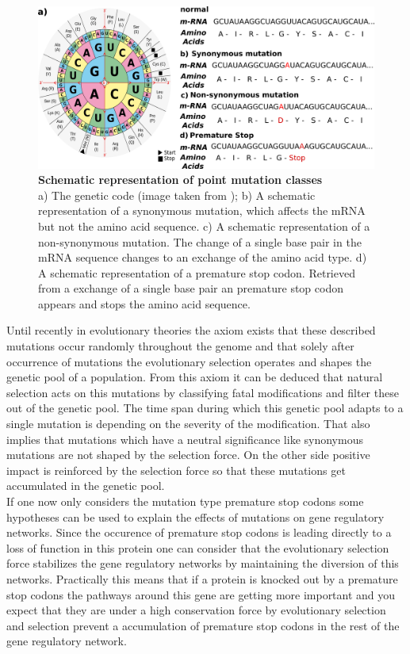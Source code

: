 \begin{figure}[tb]
    \centering
    \begin{minipage}[h]{0.9\textwidth}
      \centering
      \includegraphics[width=1\textwidth]{images/Mutations.png}
      \caption{\textbf{Schematic representation of point mutation classes}\\
      a) The genetic code (image taken from \textcite{bresch2013}); b) A schematic representation of a synonymous mutation, which affects the mRNA but not the amino acid sequence. c) A schematic representation of a non-synonymous mutation. The change of a single base pair in the mRNA sequence changes to an exchange of the amino acid type. d) A schematic representation of a premature stop codon. Retrieved from a exchange of a single base pair an premature stop codon appears and stops the amino acid sequence.}
     \label{fig:Codons}
    \end{minipage}
  \end{figure}
Until recently in evolutionary theories the axiom exists that these described mutations occur randomly throughout the genome and that solely after occurrence of mutations the evolutionary selection operates and shapes the genetic pool of a population\cite{futuyma1986}. From this axiom it can be deduced that natural selection acts on this mutations by classifying fatal modifications and filter these out of the genetic pool. The time span during which this genetic pool adapts to a single mutation is depending on the severity of the modification. That also implies that mutations which have a neutral significance like synonymous mutations are not shaped by the selection force. On the other side positive impact is reinforced by the selection force so that these mutations get accumulated in the genetic pool.\\
If one now only considers the mutation type premature stop codons some hypotheses can be used to explain the effects of mutations on gene regulatory networks. Since the occurence of premature stop codons is leading directly to a loss of function in this protein one can consider that the evolutionary selection force stabilizes the gene regulatory networks by maintaining the diversion of this networks. Practically this means that if a protein is knocked out by a premature stop codons the pathways around this gene are getting more important and you expect that they are under a high conservation force by evolutionary selection and selection prevent a accumulation of premature stop codons in the rest of the gene regulatory network.\\
